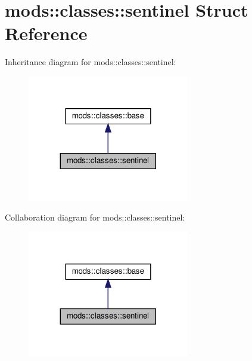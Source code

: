\hypertarget{structmods_1_1classes_1_1sentinel}{}\section{mods\+:\+:classes\+:\+:sentinel Struct Reference}
\label{structmods_1_1classes_1_1sentinel}


Inheritance diagram for mods\+:\+:classes\+:\+:sentinel\+:
\nopagebreak
\begin{figure}[H]
\begin{center}
\leavevmode
\includegraphics[width=200pt]{structmods_1_1classes_1_1sentinel__inherit__graph}
\end{center}
\end{figure}


Collaboration diagram for mods\+:\+:classes\+:\+:sentinel\+:
\nopagebreak
\begin{figure}[H]
\begin{center}
\leavevmode
\includegraphics[width=200pt]{structmods_1_1classes_1_1sentinel__coll__graph}
\end{center}
\end{figure}
